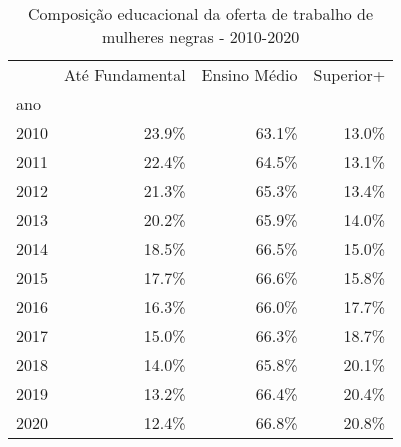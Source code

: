 \begin{table}
\centering
\caption{Composição educacional da oferta de trabalho de mulheres negras - 2010-2020}
\begin{tabular}{lrrr}
\toprule
{} &  Até Fundamental &  Ensino Médio &  Superior+ \\
ano  &                  &               &            \\
\midrule
2010 &            23.9\% &         63.1\% &      13.0\% \\
2011 &            22.4\% &         64.5\% &      13.1\% \\
2012 &            21.3\% &         65.3\% &      13.4\% \\
2013 &            20.2\% &         65.9\% &      14.0\% \\
2014 &            18.5\% &         66.5\% &      15.0\% \\
2015 &            17.7\% &         66.6\% &      15.8\% \\
2016 &            16.3\% &         66.0\% &      17.7\% \\
2017 &            15.0\% &         66.3\% &      18.7\% \\
2018 &            14.0\% &         65.8\% &      20.1\% \\
2019 &            13.2\% &         66.4\% &      20.4\% \\
2020 &            12.4\% &         66.8\% &      20.8\% \\
\bottomrule
\end{tabular}
\end{table}
